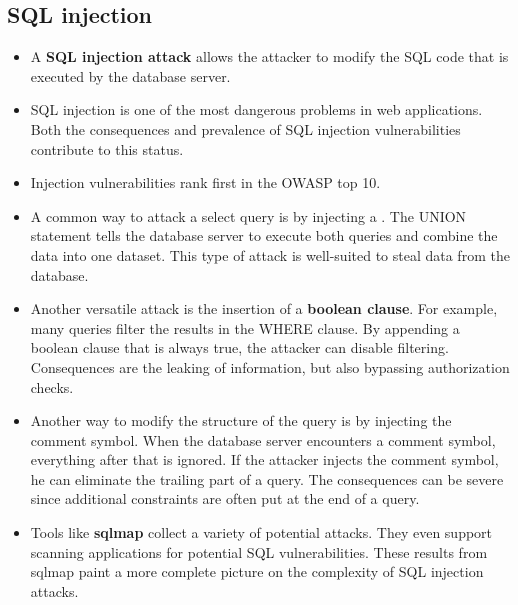 \documentclass[../main.tex]{subfiles}
\begin{document}
\subsection{SQL injection}
\begin{itemize}
\item A \textbf{SQL injection attack} allows the attacker to modify the SQL code that is executed by the database server.
\item SQL injection is one of the most dangerous problems in web applications. Both the consequences and prevalence of SQL injection vulnerabilities contribute to this status.
\item Injection vulnerabilities rank first in the OWASP top 10.
\item A common way to attack a select query is by injecting a . The UNION statement tells the database server to execute both queries and combine the data into one dataset. This type of attack is well-suited to steal data from the database.
\item Another versatile attack is the insertion of a \textbf{boolean clause}. For example, many queries filter the results in the WHERE clause. By appending a boolean clause that is always true, the attacker can disable filtering. Consequences are the leaking of information, but also bypassing authorization checks.
\item Another way to modify the structure of the query is by injecting the comment symbol. When the database server encounters a comment symbol, everything after that is ignored. If the attacker injects the comment symbol, he can eliminate the trailing part of a query. The consequences can be severe since additional constraints are often put at the end of a query.
\item Tools like \textbf{sqlmap} collect a variety of potential attacks. They even support scanning applications for potential SQL vulnerabilities. These results from sqlmap paint a more complete picture on the complexity of SQL injection attacks.
\end{itemize}
\end{document}
